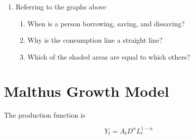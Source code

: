 \documentclass[11pt]{scrartcl}
\begin{document}
\begin{enumerate}
\item Referring to the graphs above
\begin{enumerate}
\item When is a person borrowing, saving, and dissaving? 
\item Why is the consumption line a straight line?
\item Which of the shaded areas are equal to which others?
\end{enumerate}
\end{enumerate}

\section{Malthus Growth Model}

The production function is

\[Y_t = A_t D^\alpha L_t^{1-\alpha} \]
\end{document}
